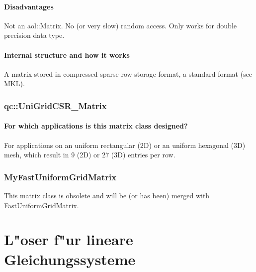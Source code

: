 \paragraph{Disadvantages}
Not an aol::Matrix. No (or very slow) random access. Only works for
double precision data type.

\paragraph{Internal structure and how it works}
A matrix stored in compressed sparse row storage format, a standard
format (see MKL).

\subsubsection{qc::UniGridCSR\_Matrix}
\paragraph{For which applications is this matrix class designed?}
For applications on an uniform rectangular (2D) or an uniform
hexagonal (3D) mesh, which result in 9 (2D) or 27 (3D) entries per
row.

\subsubsection{MyFastUniformGridMatrix}
This matrix class is obsolete and will be (or has been) merged with
FastUniformGridMatrix.


\section{L"oser f"ur lineare Gleichungssysteme}




